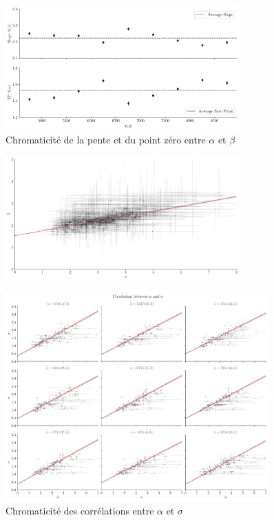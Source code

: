 \message{ !name(06_irf.tex)}\documentclass[../main/main.tex]{subfiles}
\begin{document}



\begin{figure}[ht]
  \centering
  \includegraphics[width=0.8\textwidth]{../figures/06_irf/chromaticitybeta_alpha_corr.pdf}
  \caption[Chromaticité de la pente et du point zéro entre $\alpha$ et $\beta$]{Chromaticité de la pente et du point zéro entre $\alpha$ et $\beta$}
  \label{fig:chromslope_zp_alphabeta}
\end{figure}

\begin{figure}[ht]
  \centering
  \includegraphics[width=0.8\textwidth]{../figures/06_irf/STD_alpha_beta_corr.pdf}
  \caption[]{}
  \label{fig:corralphabeta_achrom}
\end{figure}

\begin{figure}[ht]
  \centering
  \includegraphics[width=0.9\textwidth]{../figures/06_irf/STD_alpha_sigma_chromatic_corr.pdf}
  \caption[Chromaticité des corrélations entre $\alpha$ et $\sigma$]{Chromaticité des corrélations entre $\alpha$ et $\sigma$}
  \label{fig:alphasigmachromcorr}
\end{figure}
\end{document}
